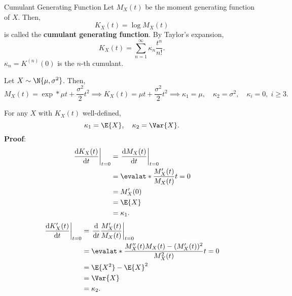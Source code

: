 \begin{Definition}{Cumulant Generating Function}{}
    Let $ M_X(t) $ be the moment generating function of $ X $. Then,
    \[ K_X(t)=\log{M_X(t)} \]
    is called the \textbf{cumulant generating function}. By Taylor's expansion,
    \[ K_X(t)=\sum_{n=1}^{\infty}\kappa_n \frac{t^n}{n!}. \]
    $ \kappa_n=K^{(n)}(0) $ is the $ n $-th cumulant.
\end{Definition}
\begin{Example}{}{}
    Let $ X \sim \N{\mu,\sigma^2} $. Then,
    \[ M_X(t)=\exp*{\mu t+\frac{\sigma^2}{2}t^2}\implies
        K_X(t)=\mu t+\frac{\sigma^2}{2}t^2\implies \kappa_1=\mu,\quad \kappa_2=\sigma^2,\quad \kappa_i=0,\; i\ge 3. \]
\end{Example}
\begin{Lemma}{}{}
    For any $ X $ with $ K_X(t) $ well-defined,
    \[ \kappa_1=\E{X},\quad \kappa_2=\Var{X}. \]
    \tcblower{}
    \textbf{Proof}:
    \begin{align*}
        \odv{K_X(t)}{t}_{t=0}
         & =\odv{\log{M_X(t)}}{t}_{t=0}           \\
         & =\evalat*{\frac{M_X'(t)}{M_X(t)}}{t=0} \\
         & =M_X'(0)                               \\
         & =\E{X}                                 \\
         & =\kappa_1.
    \end{align*}
    \begin{align*}
        \odv{K_X'(t)}{t}_{t=0}
         & =\odv*{\frac{M_X'(t)}{M_X(t)}}{t}_{t=0}                     \\
         & =\evalat*{\frac{M_X''(t)M_X(t)-(M_X'(t))^2}{M_X^2(t)}}{t=0} \\
         & =\E{X^2}-\E{X}^2                                            \\
         & =\Var{X}                                                    \\
         & =\kappa_2.
    \end{align*}
\end{Lemma}

